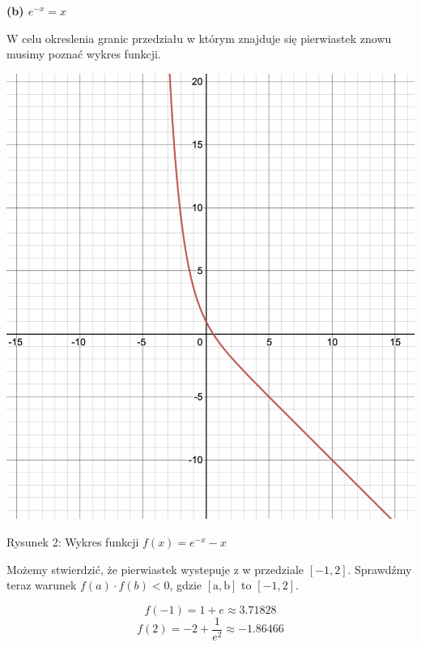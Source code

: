 \documentclass[5]{article}
\begin{document}
\textbf{(b) $e^{-x} = x$} \newline

W celu okreslenia granic przedziału w którym znajduje się pierwiastek znowu musimy poznać wykres funkcji.

\begin{center}
    \includegraphics[scale=0.4]{lab5_2.png} \par
    \vspace{2mm}
    
\end{center}

\hfil{Rysunek 2: Wykres funkcji $f(x) = e^{-x} - x$} \par

\vspace{5mm}

 Możemy stwierdzić, że pierwiastek wystepuje $\mathrm{z}$ w przedziale $[-1,2]$. Sprawdźmy teraz warunek $f(a) \cdot f(b)<0$, gdzie $[\mathrm{a}, \mathrm{b}]$ to $[-1,2]$.
 
\vspace{1mm}


$$f(-1)=1+e \approx 3.71828$$
$$f(2)=-2+\frac{1}{e^{2}} \approx-1.86466$$

\vspace{2mm}
\end{document}
